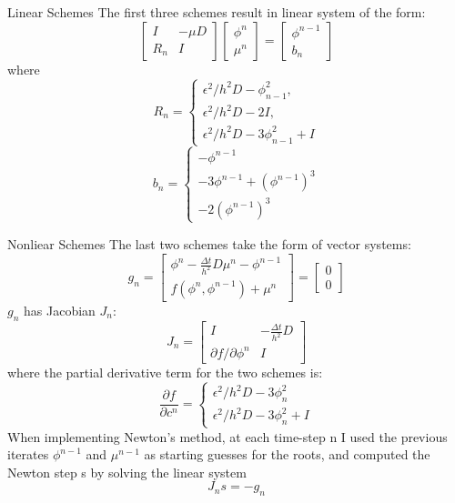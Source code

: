 \documentclass[9pt]{beamer}
\begin{document}
\begin{frame}{Linear Schemes}
The first three schemes result in  linear system of the form:
$$
\left[\begin{array}{cc}
I & -\mu D \\
R_{n} & I
\end{array}\right]\left[\begin{array}{c}
\phi^{n} \\
\mu^{n}
\end{array}\right]=\left[\begin{array}{c}
\phi^{n-1} \\
b_{n}
\end{array}\right]
$$
where
$$
R_{n}=\left\{\begin{array}{l}
\epsilon^{2} / h^{2} D-\phi_{n-1}^{2}, \\
\epsilon^{2} / h^{2} D-2 I, \\
\epsilon^{2} / h^{2} D-3 \phi_{n-1}^{2}+I
\end{array}\right.
$$
$$
b_{n}=\left\{\begin{array}{l}
-\phi^{n-1} \\
-3 \phi^{n-1}+\left(\phi^{n-1}\right)^{3} \\
-2\left(\phi^{n-1}\right)^{3}
\end{array}\right.
$$
\end{frame}

\begin{frame}{Nonliear Schemes}
The last two schemes take the form of vector systems:
$$
g_{n}=\left[\begin{array}{c}
\phi^{n}- \frac{\Delta t}{h^2} D \mu^{n}-\phi^{n-1} \\
f\left(\phi^{n}, \phi^{n-1}\right)+\mu^{n}
\end{array}\right]=\left[\begin{array}{l}
0 \\
0
\end{array}\right]
$$
$g_n$ has Jacobian $J_n$:
$$
J_{n}=\left[\begin{array}{cc}
I & -\frac{\Delta t}{h^2}  D \\
\partial f / \partial \phi^{n} & I
\end{array}\right]
$$
where the partial derivative term for the two schemes is:
$$
\frac{\partial f}{\partial c^{n}}=\left\{\begin{array}{l}
\epsilon^{2} / h^{2} D-3 \phi_{n}^{2} \\
\epsilon^{2} / h^{2} D-3 \phi_{n}^{2}+I
\end{array}\right.
$$
When implementing Newton’s method, at each time-step n I used the previous iterates $\phi^{n-1}$ and $\mu^{n-1}$ as starting guesses for the roots, and computed the Newton step s by solving the linear system
$$J_ns=-g_n$$
\end{frame}
\end{document}

